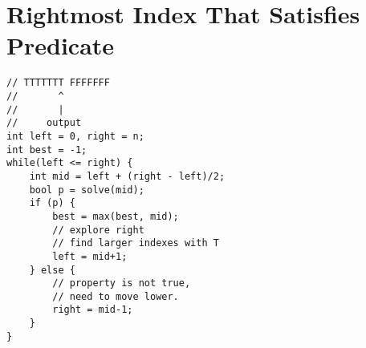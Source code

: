 \section{Rightmost Index That Satisfies Predicate}

\begin{verbatim}
// TTTTTTT FFFFFFF
//       ^
//       |
//     output
int left = 0, right = n;
int best = -1;
while(left <= right) {
    int mid = left + (right - left)/2;
    bool p = solve(mid);
    if (p) {
        best = max(best, mid);
        // explore right
        // find larger indexes with T
        left = mid+1;
    } else {
        // property is not true,
        // need to move lower.
        right = mid-1;
    }
}
\end{verbatim}


